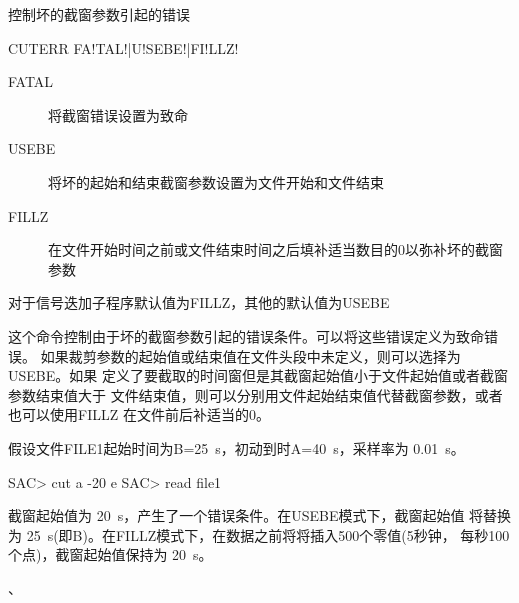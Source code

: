 \label{cmd:cuterr}

控制坏的截窗参数引起的错误

\begin{SACSTX}
CUTERR FA!TAL!|U!SEBE!|FI!LLZ!
\end{SACSTX}

\begin{description}
\item [FATAL] 将截窗错误设置为致命
\item [USEBE] 将坏的起始和结束截窗参数设置为文件开始和文件结束
\item [FILLZ] 在文件开始时间之前或文件结束时间之后填补适当数目的0以弥补坏的截窗参数
\end{description}

对于信号迭加子程序默认值为FILLZ，其他的默认值为USEBE

这个命令控制由于坏的截窗参数引起的错误条件。可以将这些错误定义为致命错误。
如果裁剪参数的起始值或结束值在文件头段中未定义，则可以选择为USEBE。如果
定义了要截取的时间窗但是其截窗起始值小于文件起始值或者截窗参数结束值大于
文件结束值，则可以分别用文件起始结束值代替截窗参数，或者也可以使用FILLZ
在文件前后补适当的0。

假设文件FILE1起始时间为B=\SI{25}{s}，初动到时A=\SI{40}{s}，采样率为 \SI{0.01}{s}。
\begin{SACCode}
SAC> cut a -20 e
SAC> read file1
\end{SACCode}
截窗起始值为 \SI{20}{s}，产生了一个错误条件。在USEBE模式下，截窗起始值
将替换为 \SI{25}{s}(即B)。在FILLZ模式下，在数据之前将将插入500个零值(5秒钟，
每秒100个点)，截窗起始值保持为 \SI{20}{s}。

、
